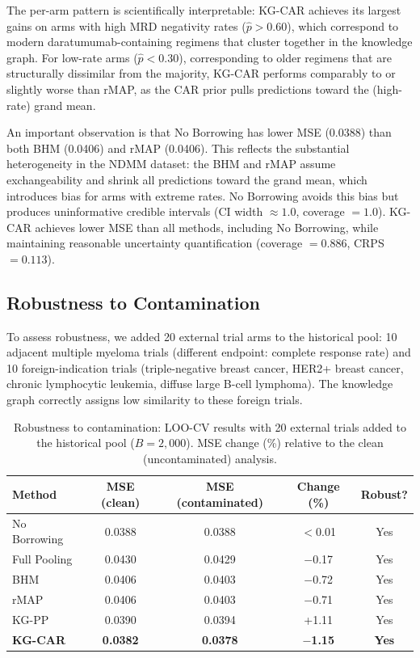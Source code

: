 \documentclass[12pt]{article}
\begin{document}
The per-arm pattern is scientifically interpretable: KG-CAR achieves its largest gains on arms with high MRD negativity rates ($\hat{p} > 0.60$), which correspond to modern daratumumab-containing regimens that cluster together in the knowledge graph. For low-rate arms ($\hat{p} < 0.30$), corresponding to older regimens that are structurally dissimilar from the majority, KG-CAR performs comparably to or slightly worse than rMAP, as the CAR prior pulls predictions toward the (high-rate) grand mean.

An important observation is that No Borrowing has lower MSE (0.0388) than both BHM (0.0406) and rMAP (0.0406). This reflects the substantial heterogeneity in the NDMM dataset: the BHM and rMAP assume exchangeability and shrink all predictions toward the grand mean, which introduces bias for arms with extreme rates. No Borrowing avoids this bias but produces uninformative credible intervals (CI width $\approx 1.0$, coverage $= 1.0$). KG-CAR achieves lower MSE than all methods, including No Borrowing, while maintaining reasonable uncertainty quantification (coverage $= 0.886$, CRPS $= 0.113$).

\subsection{Robustness to Contamination}
\label{sec:contamination}

To assess robustness, we added 20 external trial arms to the historical pool: 10 adjacent multiple myeloma trials (different endpoint: complete response rate) and 10 foreign-indication trials (triple-negative breast cancer, HER2+ breast cancer, chronic lymphocytic leukemia, diffuse large B-cell lymphoma). The knowledge graph correctly assigns low similarity to these foreign trials.

\begin{table}[ht]
\centering
\caption{Robustness to contamination: LOO-CV results with 20 external trials added to the historical pool ($B = 2{,}000$). MSE change (\%) relative to the clean (uncontaminated) analysis.}
\label{tab:robustness}
\begin{tabular}{lcccc}
\toprule
Method & MSE (clean) & MSE (contaminated) & Change (\%) & Robust? \\
\midrule
No Borrowing & 0.0388 & 0.0388 & $<$0.01 & Yes \\
Full Pooling & 0.0430 & 0.0429 & $-$0.17 & Yes \\
BHM & 0.0406 & 0.0403 & $-$0.72 & Yes \\
rMAP & 0.0406 & 0.0403 & $-$0.71 & Yes \\
KG-PP & 0.0390 & 0.0394 & +1.11 & Yes \\
\textbf{KG-CAR} & \textbf{0.0382} & \textbf{0.0378} & \textbf{$-$1.15} & \textbf{Yes} \\
\bottomrule
\end{tabular}
\end{table}
\end{document}
